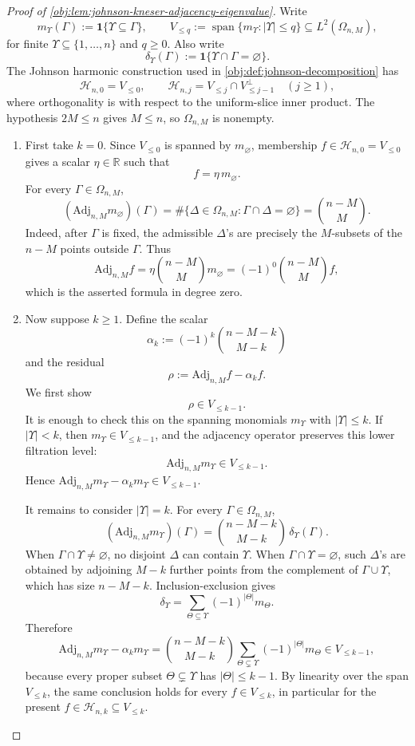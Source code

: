 \begin{proof}[Proof of \cref{obj:lem:johnson-kneser-adjacency-eigenvalue}]
Write
\[
m_{\Upsilon}(\Gamma):=\mathbf 1\{\Upsilon\subseteq \Gamma\},
\qquad
V_{\le q}:=\operatorname{span}\{m_{\Upsilon}:|\Upsilon|\le q\}\subseteq L^2(\Omega_{n,M}),
\]
for finite \(\Upsilon\subseteq\{1,\ldots,n\}\) and \(q\ge 0\). Also write
\[
\delta_{\Upsilon}(\Gamma):=\mathbf 1\{\Upsilon\cap\Gamma=\varnothing\}.
\]
The Johnson harmonic construction used in \cref{obj:def:johnson-decomposition} has
\[
\mathcal H_{n,0}=V_{\le 0},
\qquad
\mathcal H_{n,j}=V_{\le j}\cap V_{\le j-1}^{\perp}\quad(j\ge 1),
\]
where orthogonality is with respect to the uniform-slice inner product. The hypothesis \(2M\le n\) gives \(M\le n\), so \(\Omega_{n,M}\) is nonempty.

\begin{enumerate}
\item First take \(k=0\). Since \(V_{\le 0}\) is spanned by \(m_{\varnothing}\), membership \(f\in\mathcal H_{n,0}=V_{\le 0}\) gives a scalar \(\eta\in\mathbb R\) such that
\[
f=\eta\,m_{\varnothing}.
\]
For every \(\Gamma\in\Omega_{n,M}\),
\[
(\mathrm{Adj}_{n,M}m_{\varnothing})(\Gamma)
=
\#\{\Delta\in\Omega_{n,M}:\Gamma\cap\Delta=\varnothing\}
=
\binom{n-M}{M}.
\]
Indeed, after \(\Gamma\) is fixed, the admissible \(\Delta\)'s are precisely the \(M\)-subsets of the \(n-M\) points outside \(\Gamma\). Thus
\[
\mathrm{Adj}_{n,M}f
=
\eta\binom{n-M}{M}m_{\varnothing}
=
(-1)^0\binom{n-M}{M}f,
\]
which is the asserted formula in degree zero. %

\item Now suppose \(k\ge 1\). Define the scalar
\[
\alpha_k:=(-1)^k\binom{n-M-k}{M-k}
\]
and the residual
\[
\rho:=\mathrm{Adj}_{n,M}f-\alpha_k f.
\]
We first show
\[
\rho\in V_{\le k-1}.
\]
It is enough to check this on the spanning monomials \(m_{\Upsilon}\) with \(|\Upsilon|\le k\). If \(|\Upsilon|<k\), then \(m_{\Upsilon}\in V_{\le k-1}\), and the adjacency operator preserves this lower filtration level:
\[
\mathrm{Adj}_{n,M}m_{\Upsilon}\in V_{\le k-1}.
\]
Hence \(\mathrm{Adj}_{n,M}m_{\Upsilon}-\alpha_km_{\Upsilon}\in V_{\le k-1}\).

It remains to consider \(|\Upsilon|=k\). For every \(\Gamma\in\Omega_{n,M}\),
\[
(\mathrm{Adj}_{n,M}m_{\Upsilon})(\Gamma)
=
\binom{n-M-k}{M-k}\,\delta_{\Upsilon}(\Gamma).
\]
When \(\Gamma\cap\Upsilon\ne\varnothing\), no disjoint \(\Delta\) can contain \(\Upsilon\). When \(\Gamma\cap\Upsilon=\varnothing\), such \(\Delta\)'s are obtained by adjoining \(M-k\) further points from the complement of \(\Gamma\cup\Upsilon\), which has size \(n-M-k\). Inclusion-exclusion gives
\[
\delta_{\Upsilon}
=
\sum_{\Theta\subseteq\Upsilon}(-1)^{|\Theta|}m_{\Theta}.
\]
Therefore
\[
\mathrm{Adj}_{n,M}m_{\Upsilon}-\alpha_km_{\Upsilon}
=
\binom{n-M-k}{M-k}
\sum_{\Theta\subsetneq\Upsilon}(-1)^{|\Theta|}m_{\Theta}\in V_{\le k-1},
\]
because every proper subset \(\Theta\subsetneq\Upsilon\) has \(|\Theta|\le k-1\). By linearity over the span \(V_{\le k}\), the same conclusion holds for every \(f\in V_{\le k}\), in particular for the present \(f\in\mathcal H_{n,k}\subseteq V_{\le k}\). %


\end{enumerate}
\end{proof}
